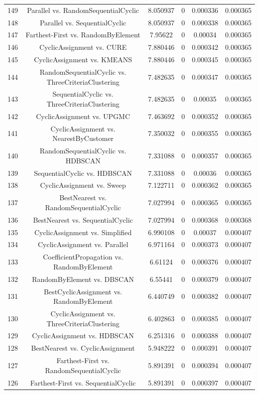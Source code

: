 \documentclass[a4paper,10pt]{article}
\begin{document}
\begin{landscape}
\begin{table}[!htp]
\begin{tabular}{cccccc}
149&Parallel vs. RandomSequentialCyclic&8.050937&0&0.000336&0.000365\\
148&Parallel vs. SequentialCyclic&8.050937&0&0.000338&0.000365\\
147&Farthest-First vs. RandomByElement&7.95622&0&0.00034&0.000365\\
146&CyclicAssignment vs. CURE&7.880446&0&0.000342&0.000365\\
145&CyclicAssignment vs. KMEANS&7.880446&0&0.000345&0.000365\\
144&RandomSequentialCyclic vs. ThreeCriteriaClustering&7.482635&0&0.000347&0.000365\\
143&SequentialCyclic vs. ThreeCriteriaClustering&7.482635&0&0.00035&0.000365\\
142&CyclicAssignment vs. UPGMC&7.463692&0&0.000352&0.000365\\
141&CyclicAssignment vs. NearestByCustomer&7.350032&0&0.000355&0.000365\\
140&RandomSequentialCyclic vs. HDBSCAN&7.331088&0&0.000357&0.000365\\
139&SequentialCyclic vs. HDBSCAN&7.331088&0&0.00036&0.000365\\
138&CyclicAssignment vs. Sweep&7.122711&0&0.000362&0.000365\\
137&BestNearest vs. RandomSequentialCyclic&7.027994&0&0.000365&0.000365\\
136&BestNearest vs. SequentialCyclic&7.027994&0&0.000368&0.000368\\
135&CyclicAssignment vs. Simplified&6.990108&0&0.00037&0.000407\\
134&CyclicAssignment vs. Parallel&6.971164&0&0.000373&0.000407\\
133&CoefficientPropagation vs. RandomByElement&6.61124&0&0.000376&0.000407\\
132&RandomByElement vs. DBSCAN&6.55441&0&0.000379&0.000407\\
131&BestCyclicAssignment vs. RandomByElement&6.440749&0&0.000382&0.000407\\
130&CyclicAssignment vs. ThreeCriteriaClustering&6.402863&0&0.000385&0.000407\\
129&CyclicAssignment vs. HDBSCAN&6.251316&0&0.000388&0.000407\\
128&BestNearest vs. CyclicAssignment&5.948222&0&0.000391&0.000407\\
127&Farthest-First vs. RandomSequentialCyclic&5.891391&0&0.000394&0.000407\\
126&Farthest-First vs. SequentialCyclic&5.891391&0&0.000397&0.000407\\

\end{tabular}
\end{table}
\end{landscape}
\end{document}
